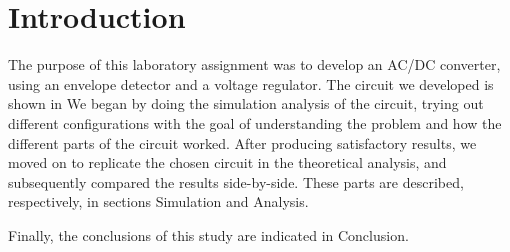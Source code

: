 \section{Introduction}
\label{sec:introduction}

The purpose of this laboratory assignment was to develop an AC/DC converter, using an envelope detector and a voltage regulator. The circuit we developed is shown in
We began by doing the simulation analysis of the circuit, trying out different configurations with the goal of understanding the problem and how the different
parts of the circuit worked. After producing satisfactory results, we moved on to replicate the chosen circuit in the theoretical analysis, and subsequently compared the results side-by-side.
These parts are described, respectively, in sections Simulation and Analysis.

Finally, the conclusions of this study are indicated in Conclusion.

